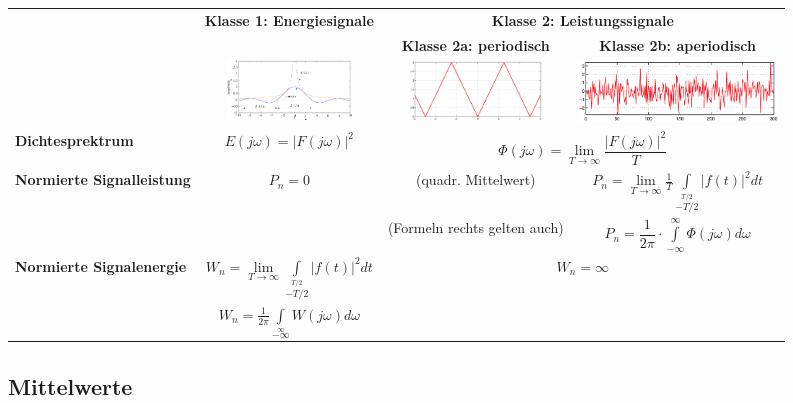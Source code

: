 			\begin{tabularx}{\textwidth}{|p{2.9cm}|c|c|c|}
			\hline
				{}
			&	\multirow{2}{*}{\textbf{Klasse 1: Energiesignale}}
			&	\multicolumn{2}{c|}{\textbf{Klasse 2: Leistungssignale}}
			\\ 
				{}
			&	
			&	\textbf{Klasse 2a: periodisch}
			&	\textbf{Klasse 2b: aperiodisch}
			\\ \hline 
				{}
			&	\includegraphics[width=3.3cm]{./bilder/sinc.png}
			& 	\includegraphics[width=3.5cm]{./bilder/dreieck.png}
			& 	\includegraphics[width=5.29cm]{./bilder/rauschen.png}
			\\ \hline 
				\textbf{Dichtesprektrum}
			& 	$ E(j \omega) = |F(j \omega)|^2 $
			& 	\multicolumn{2}{c|}{$ \Phi(j\omega) = \lim\limits_{T \to \infty} \dfrac{|F(j\omega)|^2}{T} $}
			\\ \hline 
				\textbf{Normierte Signalleistung}
			& 	$ P_n = 0$
			& 	\formel{$P_n = X^2$} (quadr. Mittelwert)
			& 	$ P_n = \lim\limits_{T \rightarrow \infty} \frac{1}{T} 
									\int\limits_{-T/2}\limits^{T/2} |f(t)|^2 dt $
			\\
				
			&
			& 	(Formeln rechts gelten auch)
			& 	$ P_n = \dfrac{1}{2\pi} \cdot \int\limits_{-\infty}^{\infty} \Phi(j\omega) d\omega $
			\\ \hline
				\textbf{Normierte Signalenergie}
			& 	$ W_n = \lim\limits_{T \rightarrow \infty} \int\limits_{-T/2}\limits^{T/2} |f(t)|^2 dt $
			&	\multicolumn{2}{c|}{$ W_n = \infty $}
			\\
				
			& 	$ W_n = \frac{1}{2 \pi} \int\limits_{-\infty}\limits^{\infty}
									W(j \omega) d\omega $
			&	\multicolumn{2}{c|}{}
			\\ \hline
			\end{tabularx}
				
	\subsection{Mittelwerte }
		
